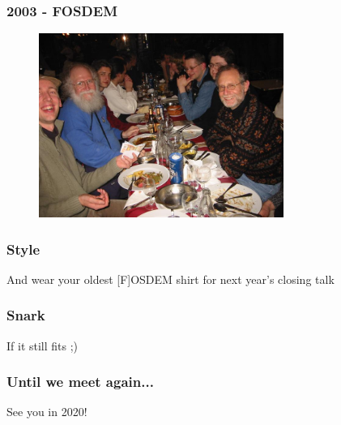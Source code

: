 \documentclass[aspectratio=169]{beamer}
\begin{document}
\begin{frame}
	\frametitle{2003 - FOSDEM}
	\vfill
	\begin{figure}[ht!]
		\includegraphics[width=80mm]{images/2003_FOSDEM.jpg}
	\end{figure}
	\vfill
\end{frame}

\begin{frame}
	\frametitle{Style}
	\vfill
	\begin{center}
		And wear your oldest [F]OSDEM shirt for next year's closing talk
	\end{center}
	\vfill
\end{frame}

\begin{frame}
	\frametitle{Snark}
	\vfill
	\begin{center}
		{\Huge If it still fits ;)}
	\end{center}
	\vfill
\end{frame}

\begin{frame}
	\frametitle{Until we meet again...}
	\vfill
	\begin{center}
		{\Huge See you in 2020!}
	\end{center}
	\vfill
\end{frame}
\end{document}
